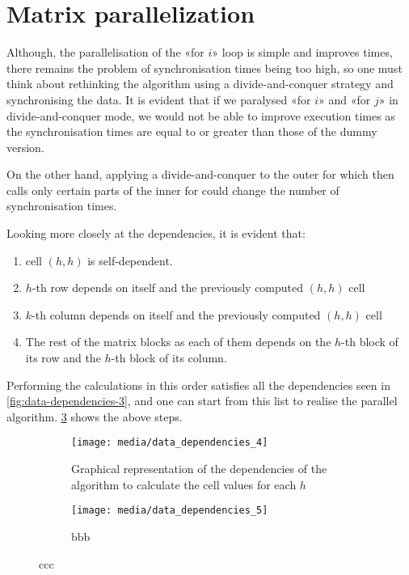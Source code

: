 \section{Matrix parallelization}\label{matrix_parallelization}

Although, the parallelisation of the «for \(i\)» loop is simple and improves times, there remains the problem of synchronisation times being too high, so one must think about rethinking the algorithm using a divide-and-conquer strategy and synchronising the data.
It is evident that if we paralysed «for \(i\)» and «for \(j\)» in divide-and-conquer mode, we would not be able to improve execution times as the synchronisation times are equal to or greater than those of the dummy version.

On the other hand, applying a divide-and-conquer to the outer for which then calls only certain parts of the inner for could change the number of synchronisation times.

Looking more closely at the dependencies, it is evident that:
\begin{enumerate}
    \item cell  \((h,h)\) is self-dependent.
    \item \(h\)-th row depends on itself and the previously computed  \((h,h)\) cell
    \item \(k\)-th column depends on itself and the previously computed  \((h,h)\) cell
    \item The rest of the matrix blocks as each of them depends on the \(h\)-th
    block of its row and the \(h\)-th block of its column.
\end{enumerate}

Performing the calculations in this order satisfies all the dependencies seen in \cref{fig:data-dependencies-3}, and one can start from this list to realise the parallel algorithm. \cref{fig:data-dependency-external-loop-parallel} shows the above steps.

\begin{figure}
    \centering
    \begin{subfigure}[t]{0.33\textwidth}
        \centering
        \texttt{[image: media/data\_dependencies\_4]}
        \caption{Graphical representation of the dependencies of the algorithm to calculate the cell values for each \(h\)}
        \label{fig:data-dependencies-4}
    \end{subfigure}
    \hfill
    \begin{subfigure}[t]{0.45\textwidth}
        \centering
        \texttt{[image: media/data\_dependencies\_5]}
        \caption{bbb}
        \label{fig:data-dependencies-5}
    \end{subfigure}
    \caption{ccc}
    \label{fig:data-dependency-external-loop-parallel}
\end{figure}

